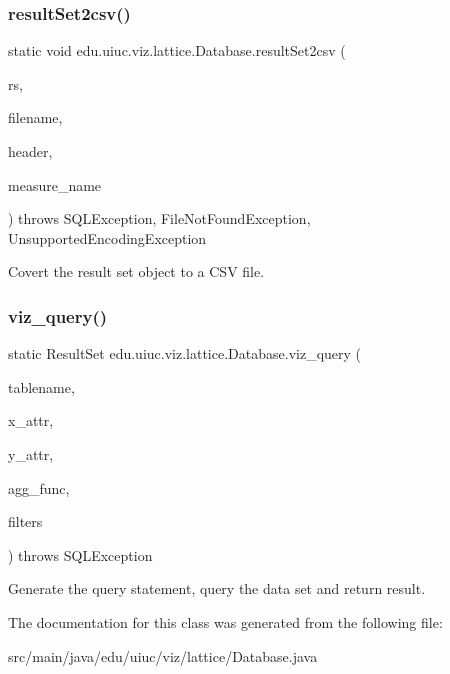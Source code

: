 \subsubsection{\texorpdfstring{resultSet2csv()}{resultSet2csv()}}
{\footnotesize\ttfamily static void edu.\+uiuc.\+viz.\+lattice.\+Database.\+result\+Set2csv (\begin{DoxyParamCaption}\item[{Result\+Set}]{rs,  }\item[{String}]{filename,  }\item[{Array\+List$<$ String $>$}]{header,  }\item[{String}]{measure\+\_\+name }\end{DoxyParamCaption}) throws S\+Q\+L\+Exception, File\+Not\+Found\+Exception, Unsupported\+Encoding\+Exception\hspace{0.3cm}{\ttfamily [static]}}

Covert the result set object to a C\+SV file. \mbox{\label{classedu_1_1uiuc_1_1viz_1_1lattice_1_1_database_a1c068934b872f09fa921a39c1094e39d}} 
\subsubsection{\texorpdfstring{viz\_query()}{viz\_query()}}
{\footnotesize\ttfamily static Result\+Set edu.\+uiuc.\+viz.\+lattice.\+Database.\+viz\+\_\+query (\begin{DoxyParamCaption}\item[{String}]{tablename,  }\item[{Array\+List$<$ String $>$}]{x\+\_\+attr,  }\item[{String}]{y\+\_\+attr,  }\item[{String}]{agg\+\_\+func,  }\item[{Array\+List$<$ String $>$}]{filters }\end{DoxyParamCaption}) throws S\+Q\+L\+Exception\hspace{0.3cm}{\ttfamily [static]}}

Generate the query statement, query the data set and return result. 

The documentation for this class was generated from the following file\+:\begin{DoxyCompactItemize}
\item 
src/main/java/edu/uiuc/viz/lattice/Database.\+java\end{DoxyCompactItemize}
